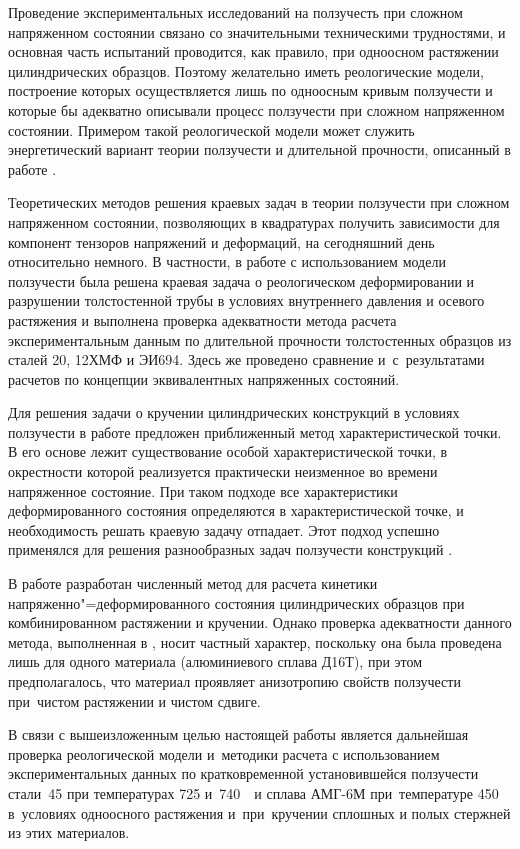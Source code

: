 Проведение экспериментальных исследований на ползучесть при сложном напряженном состоянии связано со значительными техническими трудностями, и основная часть испытаний проводится, как правило, при одноосном растяжении цилиндрических образцов. Поэтому желательно иметь реологические модели, построение которых осуществляется лишь по одноосным кривым ползучести и которые бы адекватно описывали процесс ползучести при сложном напряженном состоянии. Примером такой реологической модели может служить энергетический вариант теории ползучести и длительной прочности, описанный в работе \cite{Radchenko}.

Теоретических методов решения краевых задач в теории ползучести при сложном напряженном состоянии, позволяющих в квадратурах получить зависимости для компонент тензоров напряжений и деформаций, на сегодняшний день относительно немного. В частности, в работе \cite{RadKub98} с использованием модели ползучести \cite{Radchenko} была решена краевая задача о реологическом деформировании и разрушении толстостенной трубы в условиях внутреннего давления и осевого растяжения и выполнена проверка адекватности метода расчета экспериментальным данным по длительной прочности толстостенных образцов из сталей 20, 12ХМФ и ЭИ694. Здесь же проведено сравнение и~с~результатами расчетов по концепции эквивалентных напряженных состояний.

Для решения задачи о кручении цилиндрических конструкций в условиях ползучести в работе \cite{Gorev} предложен приближенный метод характеристической точки. В его основе лежит существование особой характеристической точки, в окрестности которой реализуется практически неизменное во времени напряженное состояние. 
При таком подходе все характеристики деформированного состояния определяются в характеристической точке, и необходимость решать краевую задачу отпадает.
Этот подход успешно применялся для решения разнообразных задач ползучести конструкций \cite{Banschikova, Sosnin}.

В работе \cite{RadTsv13} разработан численный метод для расчета кинетики напряженно"=деформированного состояния цилиндрических образцов при комбинированном растяжении и кручении. Однако проверка адекватности данного метода, выполненная в \cite{RadTsv13}, носит частный характер, поскольку она была проведена лишь для одного материала (алюминиевого сплава Д16Т), при этом предполагалось, что материал проявляет анизотропию свойств ползучести при~чистом растяжении и чистом сдвиге.

В связи с вышеизложенным целью настоящей работы является дальнейшая проверка реологической модели \cite{Radchenko} и~методики расчета \cite{RadTsv13} с использованием экспериментальных данных по кратковременной установившейся ползучести стали~45 при температурах 725 и~740\,\textcelsius~\cite{Banschikova} и сплава АМГ-6М при~температуре 450\,\textcelsius~\cite{Larichkin} в~условиях одноосного растяжения и~при~кручении сплошных и полых стержней из этих материалов.

